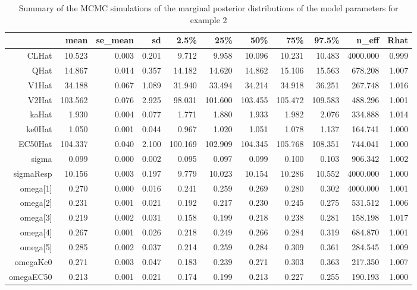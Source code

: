 \documentclass[11pt]{amsart}
\begin{document}
\begin{table}[!htb]
\centering
\caption{Summary of the MCMC simulations of the marginal posterior distributions of the model parameters for example 2}
\begin{tabular}{rrrrrrrrrrr}
  \hline
 & mean & se\_mean & sd & 2.5\% & 25\% & 50\% & 75\% & 97.5\% & n\_eff & Rhat \\ 
  \hline
CLHat & 10.523 & 0.003 & 0.201 & 9.712 & 9.958 & 10.096 & 10.231 & 10.483 & 4000.000 & 0.999 \\
QHat & 14.867 & 0.014 & 0.357 & 14.182 & 14.620 & 14.862 & 15.106 & 15.563 & 678.208 & 1.007 \\
V1Hat & 34.188 & 0.067 & 1.089 & 31.940 & 33.494 & 34.214 & 34.918 & 36.251 & 267.748 & 1.016 \\
V2Hat & 103.562 & 0.076 & 2.925 & 98.031 & 101.600 & 103.455 & 105.472 & 109.583 & 488.296 & 1.001 \\
kaHat & 1.930 & 0.004 & 0.077 & 1.771 & 1.880 & 1.933 & 1.982 & 2.076 & 334.888 & 1.014 \\
ke0Hat & 1.050 & 0.001 & 0.044 & 0.967 & 1.020 & 1.051 & 1.078 & 1.137 & 164.741 & 1.000 \\
EC50Hat & 104.337 & 0.040 & 2.100 & 100.169 & 102.909 & 104.345 & 105.768 & 108.351 & 744.041 & 1.000 \\
sigma & 0.099 & 0.000 & 0.002 & 0.095 & 0.097 & 0.099 & 0.100 & 0.103 & 906.342 & 1.002 \\
sigmaResp & 10.156 & 0.003 & 0.197 & 9.779 & 10.023 & 10.154 & 10.286 & 10.552 & 4000.000 & 1.000 \\
omega[1] & 0.270 & 0.000 & 0.016 & 0.241 & 0.259 & 0.269 & 0.280 & 0.302 & 4000.000 & 1.001 \\
omega[2] & 0.231 & 0.001 & 0.021 & 0.192 & 0.217 & 0.230 & 0.245 & 0.275 & 531.512 & 1.006 \\
omega[3] & 0.219 & 0.002 & 0.031 & 0.158 & 0.199 & 0.218 & 0.238 & 0.281 & 158.198 & 1.017 \\
omega[4] & 0.267 & 0.001 & 0.026 & 0.218 & 0.249 & 0.266 & 0.284 & 0.319 & 684.870 & 1.001 \\
omega[5] & 0.285 & 0.002 & 0.037 & 0.214 & 0.259 & 0.284 & 0.309 & 0.361 & 284.545 & 1.009 \\
omegaKe0 & 0.271 & 0.003 & 0.047 & 0.183 & 0.239 & 0.271 & 0.303 & 0.363 & 217.350 & 1.007 \\
omegaEC50 & 0.213 & 0.001 & 0.021 & 0.174 & 0.199 & 0.213 & 0.227 & 0.255 & 190.193 & 1.000 \\
  \hline
\end{tabular}
\end{table}
\end{document}
